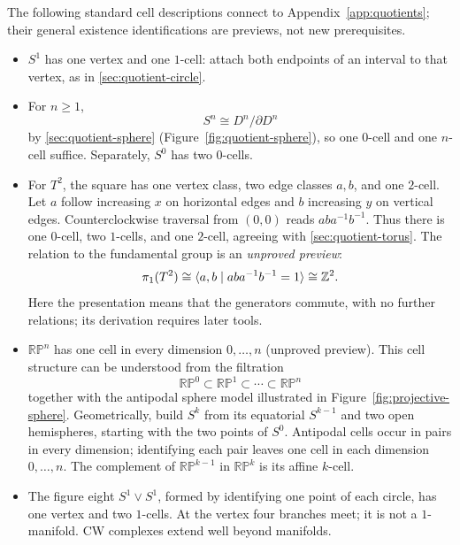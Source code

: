 \begin{example}
The following standard cell descriptions connect to Appendix~\ref{app:quotients}; their
general existence identifications are previews, not new prerequisites.
\begin{itemize}
\item $S^1$ has one vertex and one $1$-cell: attach both endpoints of an
interval to that vertex, as in \cref{sec:quotient-circle}.
\item For $n\geq1$,
\[
S^n\cong D^n/\partial D^n
\]
 by
\cref{sec:quotient-sphere} (Figure~\ref{fig:quotient-sphere}), so
one $0$-cell and one $n$-cell suffice. Separately, $S^0$ has two $0$-cells.
\item For $T^2$, the square has one vertex class, two edge classes $a,b$,
and one $2$-cell. Let $a$ follow increasing $x$ on horizontal edges and
$b$ increasing $y$ on vertical edges. Counterclockwise traversal from
$(0,0)$ reads $aba^{-1}b^{-1}$. Thus there is one $0$-cell, two $1$-cells,
and one $2$-cell, agreeing with \cref{sec:quotient-torus}.
The relation to the fundamental group is an \emph{unproved preview}:
\[
\pi_1(T^2)\cong\langle a,b\mid aba^{-1}b^{-1}=1\rangle\cong\mathbb{Z}^2.
\]
Here the presentation means that the generators commute, with no further
relations; its derivation requires later tools.
\item $\mathbb{RP}^n$ has one cell in every dimension $0,\ldots,n$
(unproved preview). This cell structure can be understood from the filtration
\[
\mathbb{RP}^0\subset\mathbb{RP}^1\subset\cdots\subset\mathbb{RP}^n
\]
together with the antipodal sphere model illustrated in
Figure~\ref{fig:projective-sphere}.
Geometrically, build $S^k$ from its equatorial $S^{k-1}$ and two open
hemispheres, starting with the two points of $S^0$. Antipodal cells
occur in pairs in every dimension; identifying each pair leaves one
cell in each dimension $0,\ldots,n$. The complement
of $\mathbb{RP}^{k-1}$ in $\mathbb{RP}^k$ is its affine $k$-cell.
\item The figure eight $S^1\vee S^1$, formed by identifying one point
of each circle, has one vertex and two $1$-cells. At the vertex four
branches meet; it is not a $1$-manifold. CW complexes extend well beyond manifolds.
\end{itemize}
\end{example}

